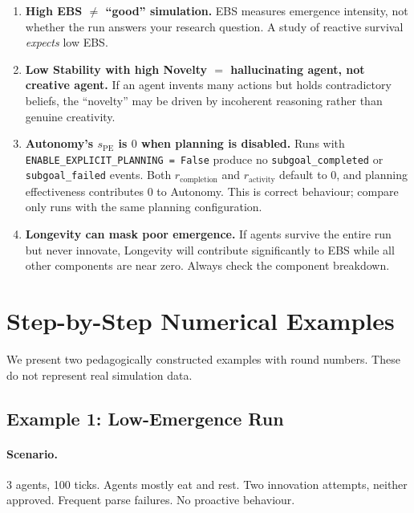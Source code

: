 \documentclass[a4paper, 11pt]{article}
\begin{document}
\begin{warningbox}[title={Common Pitfalls}]
\begin{enumerate}[nosep]
    \item \textbf{High EBS $\neq$ ``good'' simulation.} EBS measures emergence intensity, not whether the run answers your research question. A study of reactive survival \emph{expects} low EBS.
    \item \textbf{Low Stability with high Novelty $=$ hallucinating agent, not creative agent.} If an agent invents many actions but holds contradictory beliefs, the ``novelty'' may be driven by incoherent reasoning rather than genuine creativity.
    \item \textbf{Autonomy's $s_{\text{PE}}$ is $0$ when planning is disabled.} Runs with \texttt{ENABLE\_EXPLICIT\_PLANNING = False} produce no \texttt{subgoal\_completed} or \texttt{subgoal\_failed} events. Both $r_{\text{completion}}$ and $r_{\text{activity}}$ default to $0$, and planning effectiveness contributes $0$ to Autonomy. This is correct behaviour; compare only runs with the same planning configuration.
    \item \textbf{Longevity can mask poor emergence.} If agents survive the entire run but never innovate, Longevity will contribute significantly to EBS while all other components are near zero. Always check the component breakdown.
\end{enumerate}
\end{warningbox}

\section{Step-by-Step Numerical Examples}
\label{sec:examples}

We present two pedagogically constructed examples with round numbers. These do not represent real simulation data.

\subsection{Example 1: Low-Emergence Run}

\paragraph{Scenario.} 3 agents, 100 ticks. Agents mostly eat and rest. Two innovation attempts, neither approved. Frequent parse failures. No proactive behaviour.
\end{document}
